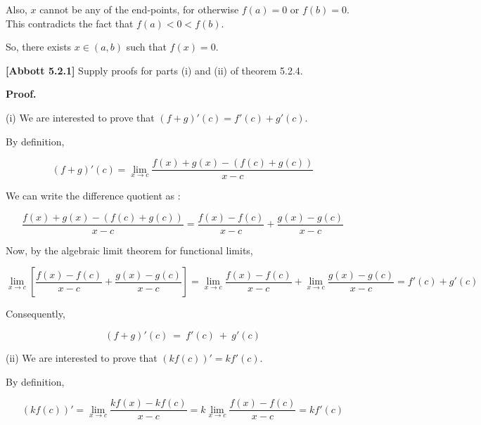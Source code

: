 \documentclass[10pt]{article}
\begin{document}
Also, $\displaystyle x$ cannot be any of the end-points, for otherwise $\displaystyle f( a) =0$ or $\displaystyle f( b) =0$. This contradicts the fact that $\displaystyle f( a) < 0< f( b)$. 



So, there exists $\displaystyle x\in ( a,b)$ such that $\displaystyle f( x) =0$. 



\textbf{ [Abbott 5.2.1]} Supply proofs for parts (i) and (ii) of theorem 5.2.4.



\textbf{Proof.}



(i) We are interested to prove that $\displaystyle ( f+g) '( c) =f'( c) +g'( c)$. 



By definition,


\begin{equation*}
( f+g) '( c) =\lim _{x\rightarrow c}\frac{f( x) +g( x) -( f( c) +g( c))}{x-c}
\end{equation*}


We can write the difference quotient as :


\begin{equation*}
\frac{f( x) +g( x) -( f( c) +g( c))}{x-c} =\frac{f( x) -f( c)}{x-c} +\frac{g( x) -g( c)}{x-c}
\end{equation*}


Now, by the algebraic limit theorem for functional limits,


\begin{equation*}
\lim _{x\rightarrow c}\left[\frac{f( x) -f( c)}{x-c} +\frac{g( x) -g( c)}{x-c}\right] =\lim _{x\rightarrow c}\frac{f( x) -f( c)}{x-c} +\lim _{x\rightarrow c}\frac{g( x) -g( c)}{x-c} =f'( c) +g'( c)
\end{equation*}


Consequently,




\begin{equation*}
( f+g) '( c) \ =\ f'( c) \ +\ g'( c)
\end{equation*}


(ii) We are interested to prove that $\displaystyle ( kf( c)) '=kf'( c)$. 



By definition,


\begin{equation*}
( kf( c)) '=\lim _{x\rightarrow c}\frac{kf( x) -kf( c)}{x-c} =k\lim _{x\rightarrow c}\frac{f( x) -f( c)}{x-c} =kf'( c)
\end{equation*}
\end{document}
